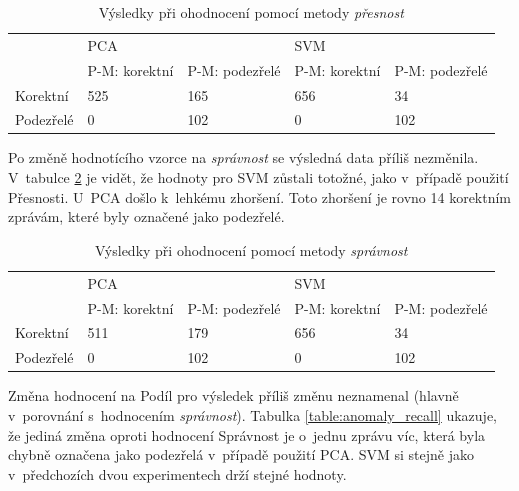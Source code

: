 \documentclass[thesis=M,czech]{FITthesis}[2012/10/20]
\begin{document}
			\begin{table}[htb]\centering
				\centering
				\caption{Výsledky při ohodnocení pomocí metody \textit{přesnost}}
				\label{table:anomaly_accuracy}
				\begin{tabular}{|l|l|l|l|l|}
					\hline
					\multirow{2}{*}{} & \multicolumn{2}{l|}{PCA}                 & \multicolumn{2}{l|}{SVM}                 \\ 
					& P-M: korektní & P-M: podezřelé & P-M: korektní & P-M: podezřelé \\ \hline
					Korektní          & 525                & 165                 & 656                & 34                  \\ \hline
					Podezřelé         & 0                  & 102                 & 0                  & 102                 \\ \hline
				\end{tabular}
			\end{table}
		
			Po změně hodnotícího vzorce na \textit{správnost} se výsledná data příliš nezměnila. V~tabulce \ref{table:anomaly_precision} je vidět, že hodnoty pro SVM zůstali totožné, jako v~případě použití Přesnosti. U~PCA došlo k~lehkému zhoršení. Toto zhoršení je rovno 14 korektním zprávám, které byly označené jako podezřelé.
		
			\begin{table}[htb]\centering
				\centering
				\caption{Výsledky při ohodnocení pomocí metody \textit{správnost}}
				\label{table:anomaly_precision}
				\begin{tabular}{|l|l|l|l|l|}
					\hline
					\multirow{2}{*}{} & \multicolumn{2}{l|}{PCA}                 & \multicolumn{2}{l|}{SVM}                 \\ 
					& P-M: korektní & P-M: podezřelé & P-M: korektní & P-M: podezřelé \\ \hline
					Korektní          & 511                & 179                 & 656                & 34                  \\ \hline
					Podezřelé         & 0                  & 102                 & 0                  & 102                 \\ \hline
				\end{tabular}
			\end{table}
		
			Změna hodnocení na Podíl pro výsledek příliš změnu neznamenal (hlavně v~porovnání s~hodnocením \textit{správnost}). Tabulka \ref{table:anomaly_recall} ukazuje, že jediná změna oproti hodnocení Správnost je o~jednu zprávu víc, která byla chybně označena jako podezřelá v~případě použití PCA. SVM si stejně jako v~předchozích dvou experimentech drží stejné hodnoty.
			
\end{document}
